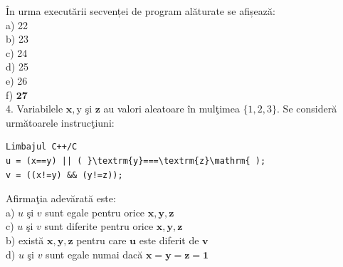 \documentclass[10pt]{article}
\begin{document}
În urma executării secvenței de program alăturate se afișează:\\
a) 22\\
b) 23\\
c) 24\\
d) 25\\
e) 26\\
f) $\mathbf{2 7}$\\
4. Variabilele $\mathbf{x}, \mathrm{y}$ şi $\mathbf{z}$ au valori aleatoare în mulţimea $\{1,2,3\}$. Se consideră următoarele instrucţiuni:

\begin{verbatim}
Limbajul C++/C
u = (x==y) || ( }\textrm{y}===\textrm{z}\mathrm{ );
v = ((x!=y) && (y!=z));
\end{verbatim}

Afirmaţia adevărată este:\\
a) $u$ şi $v$ sunt egale pentru orice $\mathbf{x}, \mathbf{y}, \mathbf{z}$\\
c) $u$ şi $v$ sunt diferite pentru orice $\mathbf{x}, \mathbf{y}, \mathbf{z}$\\
b) există $\mathbf{x}, \mathbf{y}, \mathbf{z}$ pentru care $\mathbf{u}$ este diferit de $\mathbf{v}$\\
d) $u$ şi $v$ sunt egale numai dacă $\mathbf{x}=\mathbf{y}=\mathbf{z = 1}$
\end{document}
